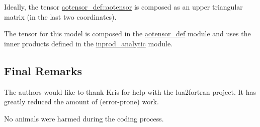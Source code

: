 Ideally, the tensor \hyperlink{namespaceaotensor__def_a0dc43bc9294a18f2fe57b67489f1702f}{aotensor\+\_\+def\+::aotensor} is composed as an upper triangular matrix (in the last two coordinates).

The tensor for this model is composed in the \hyperlink{namespaceaotensor__def}{aotensor\+\_\+def} module and uses the inner products defined in the \hyperlink{namespaceinprod__analytic}{inprod\+\_\+analytic} module.





\subsection*{Final Remarks}

The authors would like to thank Kris for help with the lua2fortran project. It has greatly reduced the amount of (error-\/prone) work.

No animals were harmed during the coding process. 